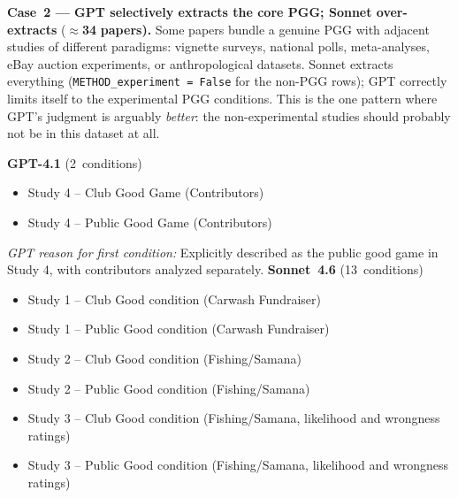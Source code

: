 \documentclass[11pt,a4paper]{article}
\begin{document}
\textbf{Case~2 --- GPT selectively extracts the core PGG; Sonnet over-extracts}
($\approx$\textbf{34} \textbf{papers).}
        Some papers bundle a genuine PGG with adjacent studies of different paradigms:
        vignette surveys, national polls, meta-analyses, eBay auction experiments,
        or anthropological datasets.  Sonnet extracts everything
        (\texttt{METHOD\_experiment = False} for the non-PGG rows); GPT correctly
        limits itself to the experimental PGG conditions.
        This is the one pattern where GPT's judgment is arguably \emph{better}:
        the non-experimental studies should probably not be in this dataset at all.

              \begin{tcolorbox}[
            title={\textbf{Case 2 — GPT extracts only the core PGG; Sonnet adds non-PGG studies} (name-match 100\%) --- DOI: 10.1037\_a0033495},
            colback=blue!4!white, colframe=blue!55!black,
            fonttitle=\small\sffamily,
            sidebyside, sidebyside align=top seam,
            lower separated=false, breakable,
            before upper={\small}, before lower={\small},
          ]
          \textbf{GPT-4.1} (2~conditions)\\[4pt]
          \begin{itemize}[leftmargin=*,noitemsep,topsep=0pt]
            \item Study 4 – Club Good Game (Contributors)
\item Study 4 – Public Good Game (Contributors)
          \end{itemize}
          \medskip\textit{GPT reason for first condition:} Explicitly described as the public good game in Study 4, with contributors analyzed separately.
          \tcblower
          \textbf{Sonnet~4.6} (13~conditions)\\[4pt]
          \begin{itemize}[leftmargin=*,noitemsep,topsep=0pt]
            \item Study 1 – Club Good condition (Carwash Fundraiser)
\item Study 1 – Public Good condition (Carwash Fundraiser)
\item Study 2 – Club Good condition (Fishing/Samana)
\item Study 2 – Public Good condition (Fishing/Samana)
\item Study 3 – Club Good condition (Fishing/Samana, likelihood and wrongness ratings)
\item Study 3 – Public Good condition (Fishing/Samana, likelihood and wrongness ratings)

\end{itemize}
\end{tcolorbox}
\end{document}
